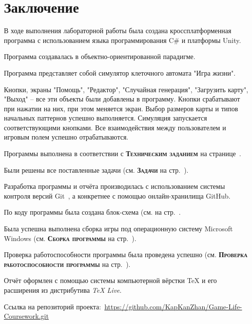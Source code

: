 \documentclass[14pt, oneside]{altsu-report}
\begin{document}



\chapter*{Заключение}
В ходе выполнения лабораторной работы была создана кроссплатформенная программа с использованием языка программирования C\# и платформы Unity.

Программа создавалась в объектно-ориентированной парадигме.

Программа представляет собой симулятор клеточного автомата "Игра жизни".

Кнопки, экраны "Помощь", "Редактор", "Случайная генерация", "Загрузить карту", "Выход" – все эти объекты были добавлены в программу. Кнопки срабатывают при нажатии на них, при этом меняется экран. Выбор размеров карты и типов начальных паттернов успешно выполняется. Симуляция запускается соответствующими кнопками. Все взаимодействия между пользователем и игровым полем успешно отрабатываются.

Программы выполнена в соответствии с \textbf{\textsc{Техническим заданием}} на странице~\pageref{sec:ch01/sec01}.

Были решены все поставленные задачи (см. \textbf{\textsc{Задачи}} на стр.~\pageref{zadachi}).

Разработка программы и отчёта производилась с использованием системы контроля версий Git~\cite{git}, а конкретнее с помощью онлайн-хранилища GitHub.

По коду программы была создана блок-схема (см. на стр.~\pageref{fig5}.

Была успешна выполнена сборка игры под операционную систему Microsoft Windows (см. \textbf{\textsc{Сборка программы}} на стр.~\pageref{sec:ch02/sec01/sub06}).

Проверка работоспособности программы была проведена успешно (см. \textbf{\textsc{Проверка работоспособности программы}} на стр.~\pageref{sec:ch02/sec01/sub7}).

Отчёт оформлен с помощью системы компьютерной вёрстки \TeX{} и его расширения \XeTeX{} из дистрибутива \textit{TeX Live}.

Ссылка на репозиторий проекта:~\textcolor{blue}{\url{https://github.com/KapKanZhan/Game-Life-Coursework.git}}

\newpage
{}
\printbibliography[title={СПИСОК ИСПОЛЬЗОВАННОЙ ЛИТЕРАТУРЫ}]


\end{document}
